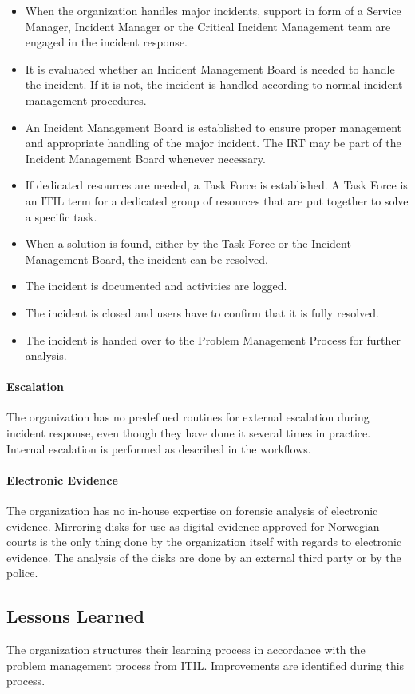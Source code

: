 \begin{itemize}
\item When the organization handles major incidents, support in form of a Service Manager, Incident Manager or the Critical Incident Management team are engaged in the incident response.
\item It is evaluated whether an Incident Management Board is needed to handle the incident. If it is not, the incident is handled according to normal incident management procedures.
\item An Incident Management Board is established to ensure proper management and appropriate handling of the major incident. The \ac{IRT} may be part of the Incident Management Board whenever necessary.
\item If dedicated resources are needed, a Task Force is established. A Task Force is an ITIL term for a dedicated group of resources that are put together to solve a specific task.
\item When a solution is found, either by the Task Force or the Incident Management Board, the incident can be resolved.
\item The incident is documented and activities are logged.
\item The incident is closed and users have to confirm that it is fully resolved.
\item The incident is handed over to the Problem Management Process for further analysis.  
\end{itemize}


\paragraph{Escalation}
The organization has no predefined routines for external escalation during incident response, even though they have done it several times in practice. Internal escalation is performed as described in the workflows.

\paragraph{Electronic Evidence}
The organization has no in-house expertise on forensic analysis of electronic evidence. Mirroring disks for use as digital evidence approved for Norwegian courts is the only thing done by the organization itself with regards to electronic evidence. The analysis of the disks are done by an external third party or by the police.

\subsection{Lessons Learned}
The organization structures their learning process in accordance with the problem management process from ITIL. Improvements are identified during this process. 

